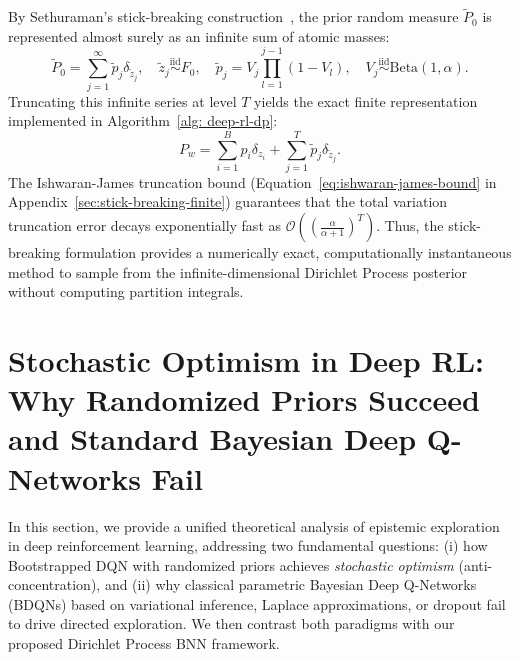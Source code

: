 \documentclass[10pt]{article}
\begin{document}
By Sethuraman's stick-breaking construction~\citep{sethuraman1994constructive}, the prior random measure $\tilde{P}_0$ is represented almost surely as an infinite sum of atomic masses:
\begin{equation}
\tilde{P}_0 = \sum_{j=1}^\infty \tilde{p}_j \delta_{\tilde{z}_j}, \quad \tilde{z}_j \stackrel{\text{iid}}{\sim} F_0, \quad \tilde{p}_j = V_j \prod_{l=1}^{j-1}(1 - V_l), \quad V_j \stackrel{\text{iid}}{\sim} \mathrm{Beta}(1, \alpha).
\end{equation}
Truncating this infinite series at level $T$ yields the exact finite representation implemented in Algorithm~\ref{alg: deep-rl-dp}:
\begin{equation}
P_w = \sum_{i=1}^B p_i \delta_{z_i} + \sum_{j=1}^T \tilde{p}_j \delta_{\tilde{z}_j}.
\end{equation}
The Ishwaran-James truncation bound (Equation~\eqref{eq:ishwaran-james-bound} in Appendix~\ref{sec:stick-breaking-finite}) guarantees that the total variation truncation error decays exponentially fast as $\mathcal{O}((\frac{\alpha}{\alpha+1})^T)$. Thus, the stick-breaking formulation provides a numerically exact, computationally instantaneous method to sample from the infinite-dimensional Dirichlet Process posterior without computing partition integrals.













\section{Stochastic Optimism in Deep RL: Why Randomized Priors Succeed and Standard Bayesian Deep Q-Networks Fail}
\label{sec:stochastic-optimism-and-bdqn-failure}

In this section, we provide a unified theoretical analysis of epistemic exploration in deep reinforcement learning, addressing two fundamental questions: (i) how Bootstrapped DQN with randomized priors achieves \emph{stochastic optimism} (anti-concentration), and (ii) why classical parametric Bayesian Deep Q-Networks (BDQNs) based on variational inference, Laplace approximations, or dropout fail to drive directed exploration. We then contrast both paradigms with our proposed Dirichlet Process BNN framework.
\end{document}

